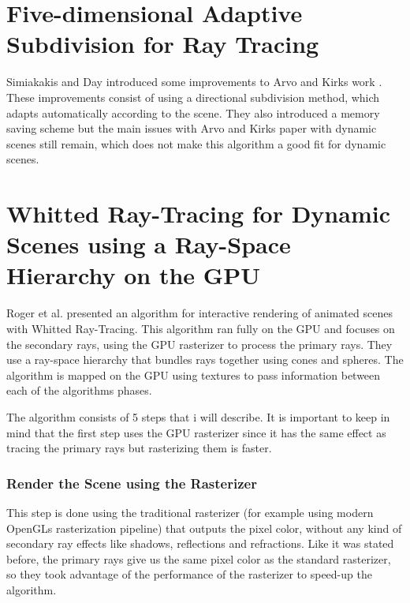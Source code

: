 \section{Five-dimensional Adaptive Subdivision for Ray Tracing}
\label{section:backgroud_simiakakis94}

Simiakakis and Day \cite{Simiakakis94} introduced some improvements to Arvo and Kirks work \cite{Arvo87}. These improvements consist of using a directional subdivision method, which adapts automatically according to the scene. They also introduced a memory saving scheme but the main issues with Arvo and Kirks paper with dynamic scenes still remain, which does not make this algorithm a good fit for dynamic scenes.

\section{Whitted Ray-Tracing for Dynamic Scenes using a Ray-Space Hierarchy on the GPU}
\label{section:backgroud_roger07}

Roger et al. \cite{Roger07} presented an algorithm for interactive rendering of animated scenes with Whitted Ray-Tracing. This algorithm ran fully on the GPU and focuses on the secondary rays, using the GPU rasterizer to process the primary rays. They use a ray-space hierarchy that bundles rays together using cones and spheres. The algorithm is mapped on the GPU using textures to pass information between each of the algorithms phases.

\medskip

The algorithm consists of 5 steps that i will describe. It is important to keep in mind that the first step uses the GPU rasterizer since it has the same effect as tracing the primary rays but rasterizing them is faster.

\subsubsection{Render the Scene using the Rasterizer}

This step is done using the traditional rasterizer (for example using modern OpenGLs rasterization pipeline) that outputs the pixel color, without any kind of secondary ray effects like shadows,  reflections and refractions. Like it was stated  before, the primary rays give us the same pixel color as the standard rasterizer, so they took advantage of the performance of the rasterizer to speed-up the algorithm.

